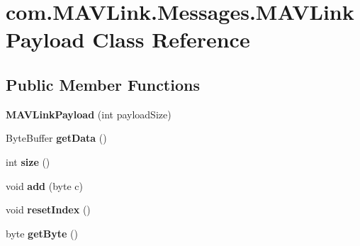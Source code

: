 \hypertarget{classcom_1_1MAVLink_1_1Messages_1_1MAVLinkPayload}{}\section{com.\+M\+A\+V\+Link.\+Messages.\+M\+A\+V\+Link\+Payload Class Reference}
\label{classcom_1_1MAVLink_1_1Messages_1_1MAVLinkPayload}
\subsection*{Public Member Functions}
\begin{DoxyCompactItemize}
\item 
\mbox{\label{classcom_1_1MAVLink_1_1Messages_1_1MAVLinkPayload_a52241a9e8926e1509ce7e0ca8c739650}} 
{\bfseries M\+A\+V\+Link\+Payload} (int payload\+Size)
\item 
\mbox{\label{classcom_1_1MAVLink_1_1Messages_1_1MAVLinkPayload_afe1be038f7949b4bb5c414376563a402}} 
Byte\+Buffer {\bfseries get\+Data} ()
\item 
\mbox{\label{classcom_1_1MAVLink_1_1Messages_1_1MAVLinkPayload_acda2cb5765dc67990f291c6b276fd353}} 
int {\bfseries size} ()
\item 
\mbox{\label{classcom_1_1MAVLink_1_1Messages_1_1MAVLinkPayload_ae0ce3288a9e8c34a612b345dca33d9c6}} 
void {\bfseries add} (byte c)
\item 
\mbox{\label{classcom_1_1MAVLink_1_1Messages_1_1MAVLinkPayload_a86857b6eb119be6cc6dae40f4ce05e2a}} 
void {\bfseries reset\+Index} ()
\item 
\mbox{\label{classcom_1_1MAVLink_1_1Messages_1_1MAVLinkPayload_aa7100d3f072a6677e78efe43cdccaca4}} 
byte {\bfseries get\+Byte} ()
\item 
\mbox{\label{classcom_1_1MAVLink_1_1Messages_1_1MAVLinkPayload_a190a194ade51e14174a0c6e64c9da2c3}} 

\end{DoxyCompactItemize}
